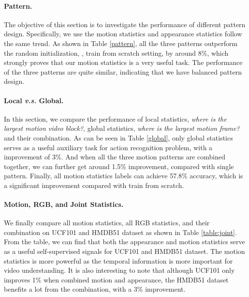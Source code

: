 \documentclass[10pt,twocolumn,letterpaper]{article}
\begin{document}
\vspace{-3mm}
\paragraph{Pattern.} The objective of this section is to investigate the performance of different pattern design. Specifically, we use the motion statistics and appearance statistics follow the same trend. As shown in Table \ref{pattern}, all the three patterns outperform the random initialization, \ie, train from scratch setting, by around 8\%,  which strongly proves that our motion statistics is a very useful task. The performance of the three patterns are quite similar, indicating that we have balanced pattern design.

\vspace{-3mm}
\paragraph{Local \emph{v.s.} Global.} In this section, we compare the performance of local statistics, \textit{where is the largest motion video block?},  global statistics, \textit{where is the largest motion frame?} and their combination. As can be seen in Table \ref{global}, only global statistics serves as a useful auxiliary task for action recognition problem, with a improvement of 3\%. And when all the three motion patterns are combined together, we can further get around 1.5\% improvement, compared with single pattern. Finally, all motion statistics labels can achieve 57.8\% accuracy, which is a significant improvement compared with train from scratch. 

\vspace{-3mm}
\paragraph{Motion, RGB, and Joint Statistics.} We finally compare all motion statistics, all RGB statistics, and their combination on UCF101 and HMDB51 dataset as shown in Table \ref{table:joint}.  From the table, we can find that both the appearance and motion statistics serve as a useful self-supervised signals for UCF101 and HMDB51 dataset. The motion statistics is more powerful as the temporal information is more important for video understanding. It is also interesting to note that although UCF101 only improves 1\% when combined motion and appearance, the HMDB51 dataset benefits a lot from the combination, with a 3\% improvement.   
\end{document}
